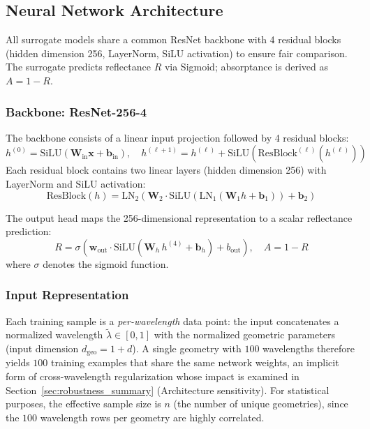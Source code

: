 \documentclass[a4paper,fleqn]{cas-sc}
\begin{document}
\subsection{Neural Network Architecture}
\label{sec:architecture}

All surrogate models share a common ResNet backbone with 4 residual blocks (hidden dimension 256, LayerNorm, SiLU activation) to ensure fair comparison. The surrogate predicts reflectance $R$ via Sigmoid; absorptance is derived as $A = 1 - R$.

\subsubsection{Backbone: ResNet-256-4}

The backbone consists of a linear input projection followed by 4 residual blocks:
\begin{equation}
h^{(0)} = \text{SiLU}(\bm{W}_\text{in} \bm{x} + \bm{b}_\text{in}), \quad
h^{(\ell+1)} = h^{(\ell)} + \text{SiLU}\!\left(\text{ResBlock}^{(\ell)}(h^{(\ell)})\right)
\end{equation}
Each residual block contains two linear layers (hidden dimension 256) with LayerNorm and SiLU activation:
\begin{equation}
\text{ResBlock}(h) = \text{LN}_2\!\left(\bm{W}_2 \cdot \text{SiLU}\!\left(\text{LN}_1(\bm{W}_1 h + \bm{b}_1)\right) + \bm{b}_2\right)
\end{equation}

The output head maps the 256-dimensional representation to a scalar reflectance prediction:
\begin{equation}
R = \sigma\!\left(\bm{w}_\text{out} \cdot \text{SiLU}(\bm{W}_h \, h^{(4)} + \bm{b}_h) + b_\text{out}\right), \quad A = 1 - R
\end{equation}
where $\sigma$ denotes the sigmoid function.

\subsubsection{Input Representation}

Each training sample is a \emph{per-wavelength} data point: the input concatenates a normalized wavelength $\tilde{\lambda} \in [0,1]$ with the normalized geometric parameters (input dimension $d_\text{geo} = 1 + d$). A single geometry with $100$ wavelengths therefore yields $100$ training examples that share the same network weights, an implicit form of cross-wavelength regularization whose impact is examined in Section~\ref{sec:robustness_summary} (Architecture sensitivity). For statistical purposes, the effective sample size is $n$ (the number of unique geometries), since the $100$ wavelength rows per geometry are highly correlated.
\end{document}
